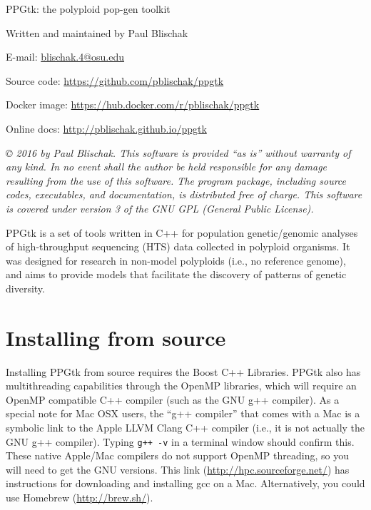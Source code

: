 \documentclass[11pt,english,letterpaper,oneside]{article}
\begin{document}
\pagestyle{empty}

\vspace*{1.5in}
\begin{center}

	{\huge PPGtk: the polyploid pop-gen toolkit}
	\vspace{0.5in}

	Written and maintained by Paul Blischak

	E-mail: {\href{mailto:blischak.4@osu.edu}{blischak.4@osu.edu}}

	Source code: {\url{https://github.com/pblischak/ppgtk}}
	
	Docker image: {\url{https://hub.docker.com/r/pblischak/ppgtk}}

	Online docs: {\url{http://pblischak.github.io/ppgtk}}

\end{center}

\vspace{4in}

{\small \textit{\copyright{} 2016 by Paul Blischak. This software is provided ``as is'' without warranty of any kind. In no event shall the author be held responsible for any damage resulting from the use of this software. The program package, including source codes, executables, and documentation, is distributed free of charge. This software is covered under version 3 of the GNU GPL (General Public License).}}

\newpage

{ \tableofcontents }

\newpage

\clearpage
\pagestyle{plain}
\setcounter{page}{1}

PPGtk is a set of tools written in C++ for population genetic/genomic analyses of high-throughput sequencing (HTS) data collected in polyploid organisms. It was designed for research in non-model polyploids (i.e., no reference genome), and aims to provide models that facilitate the discovery of patterns of genetic diversity. 



\section{Installing from source}

Installing PPGtk from source requires the Boost C++ Libraries. PPGtk also has multithreading capabilities through the OpenMP libraries, which will require an OpenMP compatible C++ compiler (such as the GNU g++ compiler). As a special note for Mac OSX users, the ``g++ compiler'' that comes with a Mac is a symbolic link to the Apple LLVM Clang C++ compiler (i.e., it is not actually the GNU g++ compiler). Typing \texttt{g++ -v} in a terminal window should confirm this. These native Apple/Mac compilers do not support OpenMP threading, so you will need to get the GNU versions. This link ({\url{http://hpc.sourceforge.net/}}) has instructions for downloading and installing gcc on a Mac. Alternatively, you could use Homebrew ({\url{http://brew.sh/}}).
\end{document}
